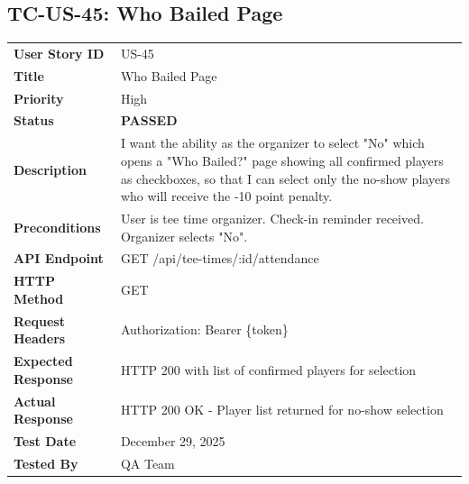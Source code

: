 \documentclass[11pt,a4paper]{article}
\newcommand{\passed}{\textcolor{pass}{\textbf{PASSED}}}
\begin{document}
\vspace{0.5cm}


\subsection{TC-US-45: Who Bailed Page}

\begin{tabularx}{\textwidth}{|p{3.2cm}|Y|}
\hline
{}
 \\
\hline
\textbf{User Story ID} & US-45 \\
\hline
\textbf{Title} & Who Bailed Page \\
\hline
\textbf{Priority} & High \\
\hline
\textbf{Status} & \passed \\
\hline
\textbf{Description} & I want the ability as the organizer to select "No" which opens a "Who Bailed?" page showing all confirmed players as checkboxes, so that I can select only the no-show players who will receive the -10 point penalty. \\
\hline
\textbf{Preconditions} & User is tee time organizer. Check-in reminder received. Organizer selects "No". \\
\hline
\textbf{API Endpoint} & GET /api/tee-times/:id/attendance \\
\hline
\textbf{HTTP Method} & GET \\
\hline
\textbf{Request Headers} & Authorization: Bearer \{token\} \\
\hline
\textbf{Expected Response} & HTTP 200 with list of confirmed players for selection \\
\hline
\textbf{Actual Response} & HTTP 200 OK - Player list returned for no-show selection \\
\hline
\textbf{Test Date} & December 29, 2025 \\
\hline
\textbf{Tested By} & QA Team \\
\hline
\end{tabularx}
\end{document}
